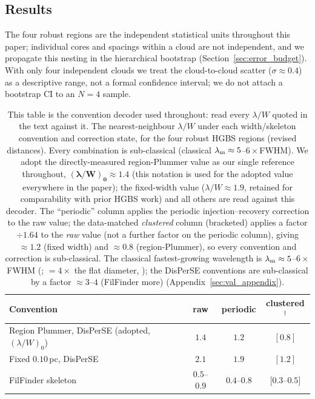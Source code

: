 \documentclass[usenatbib,twoside,twocolumn]{mnras}
\begin{document}
\subsection{Results}

The four robust regions are the independent statistical units throughout this paper; individual cores and spacings within a cloud are not independent, and we propagate this nesting in the hierarchical bootstrap (Section~\ref{sec:error_budget}). With only four independent clouds we treat the cloud-to-cloud scatter ($\sigma\approx0.4$) as a descriptive range, not a formal confidence interval; we do not attach a bootstrap CI to an $N=4$ sample.

\begin{table}
\caption{This table is the convention decoder used throughout: read every $\lambda/W$ quoted in the text against it. The nearest-neighbour $\lambda/W$ under each width/skeleton convention and correction state, for the four robust HGBS regions (revised distances). Every combination is sub-classical (classical $\lambda_{\rm m}\approx5$--$6\times$FWHM). We adopt the directly-measured region-Plummer value as our single reference throughout, $\boldsymbol{(\lambda/W)_0\approx1.4}$ (this notation is used for the adopted value everywhere in the paper); the fixed-width value ($\lambda/W\approx1.9$, retained for comparability with prior HGBS work) and all others are read against this decoder. The ``periodic'' column applies the periodic injection--recovery correction to the raw value; the data-matched \emph{clustered} column (bracketed) applies a factor $\div1.64$ to the \emph{raw} value (not a further factor on the periodic column), giving $\approx1.2$ (fixed width) and $\approx0.8$ (region-Plummer), so every convention and correction is sub-classical. The classical fastest-growing wavelength is $\lambda_{\rm m}\approx5$--$6\times$FWHM (\citealt{Fischera2012}; $=4\times$ the flat diameter, \citealt{Inutsuka1992}); the DisPerSE conventions are sub-classical by a factor $\approx3$--$4$ (FilFinder more) (Appendix~\ref{sec:val_appendix}).}
\label{tab:headline}
\footnotesize
\setlength{\tabcolsep}{4pt}
\begin{tabular}{p{3.6cm}ccc}
\toprule
Convention & raw & periodic & clustered$^{\dagger}$ \\
\midrule
Region Plummer, DisPerSE (adopted, $(\lambda/W)_0$) & $\mathbf{1.4}$ & $1.2$ & $[0.8]$ \\
Fixed $0.10$\,pc, DisPerSE & $2.1$ & $1.9$ & $[1.2]$ \\
FilFinder skeleton & $0.5$--$0.9$ & $0.4$--$0.8$ & $[0.3$--$0.5]$ \\

\end{tabular}
\end{table}
\end{document}
